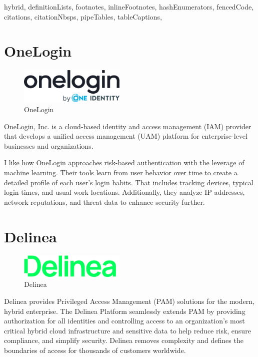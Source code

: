 \documentclass[
  digital,     %
  oneside,     %
  nosansbold,  %
  nocolorbold, %
  lof,         %
  lot,         %
]{fithesis4}
\begin{document}
\begin{markdown*}{%
  hybrid,
  definitionLists,
  footnotes,
  inlineFootnotes,
  hashEnumerators,
  fencedCode,
  citations,
  citationNbsps,
  pipeTables,
  tableCaptions,
}

\newpage
\section{OneLogin}

\begin{figure}[htbp]
  \centering
  \includegraphics[width=0.45\textwidth]{img/onelogin.png}
  \caption{OneLogin}
  \label{fig:onelogin-logo}
\end{figure}

OneLogin, Inc. is a cloud-based identity and access management (IAM) provider that develops a unified access management (UAM) platform for enterprise-level businesses and organizations.

I like how OneLogin approaches risk-based authentication with the leverage of machine learning. 
Their tools learn from user behavior over time to create a detailed profile of each user's login habits.
That includes tracking devices, typical login times, and usual work locations.
Additionally, they analyze IP addresses, network reputations, and threat data to enhance security further.

\section{Delinea}

\begin{figure}[htbp]
  \centering
  \includegraphics[width=0.45\textwidth]{img/delinea.png}
  \caption{Delinea}
  \label{fig:delinea-logo}
\end{figure}

Delinea provides Privileged Access Management (PAM) solutions for the modern, hybrid enterprise.
The Delinea Platform seamlessly extends PAM by providing authorization for all identities and controlling access to an organization’s most critical hybrid cloud infrastructure and sensitive data to help reduce risk, ensure compliance, and simplify security.
Delinea removes complexity and defines the boundaries of access for thousands of customers worldwide.


\end{markdown*}
\end{document}
